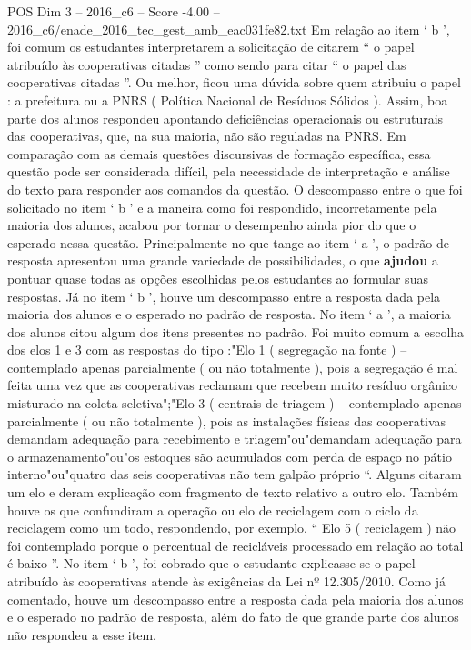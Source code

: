 \begin{textsample}{POS Dim 3 – 2016\_c6 – Score -4.00 – 2016\_c6/enade\_2016\_tec\_gest\_amb\_eac031fe82.txt}
Em relação ao item ‘ b ’, foi comum os estudantes interpretarem a solicitação de citarem “ o papel atribuído às cooperativas citadas ” como sendo para citar “ o papel das cooperativas citadas ”.
Ou melhor, ficou uma dúvida sobre quem atribuiu o papel : a prefeitura ou a PNRS ( Política Nacional de Resíduos Sólidos ).
Assim, boa parte dos alunos respondeu apontando deficiências operacionais ou estruturais das cooperativas, que, na sua maioria, não são reguladas na PNRS.
Em comparação com as demais questões discursivas de formação específica, essa questão pode ser considerada difícil, pela necessidade de interpretação e análise do texto para responder aos comandos da questão.
O descompasso entre o que foi solicitado no item ‘ b ’ e a maneira como foi respondido, incorretamente pela maioria dos alunos, acabou por tornar o desempenho ainda pior do que o esperado nessa questão.
Principalmente no que tange ao item ‘ a ’, o padrão de resposta apresentou uma grande variedade de possibilidades, o que \textbf{ajudou} a pontuar quase todas as opções escolhidas pelos estudantes ao formular suas respostas.
Já no item ‘ b ’, houve um descompasso entre a resposta dada pela maioria dos alunos e o esperado no padrão de resposta.
No item ‘ a ’, a maioria dos alunos citou algum dos itens presentes no padrão.
Foi muito comum a escolha dos elos 1 e 3 com as respostas do tipo :"Elo 1 ( segregação na fonte ) – contemplado apenas parcialmente ( ou não totalmente ), pois a segregação é mal feita uma vez que as cooperativas reclamam que recebem muito resíduo orgânico misturado na coleta seletiva";"Elo 3 ( centrais de triagem ) – contemplado apenas parcialmente ( ou não totalmente ), pois as instalações físicas das cooperativas demandam adequação para recebimento e triagem"ou"demandam adequação para o armazenamento"ou"os estoques são acumulados com perda de espaço no pátio interno"ou"quatro das seis cooperativas não tem galpão próprio “.
Alguns citaram um elo e deram explicação com fragmento de texto relativo a outro elo.
Também houve os que confundiram a operação ou elo de reciclagem com o ciclo da reciclagem como um todo, respondendo, por exemplo, “ Elo 5 ( reciclagem ) não foi contemplado porque o percentual de recicláveis processado em relação ao total é baixo ”.
No item ‘ b ’, foi cobrado que o estudante explicasse se o papel atribuído às cooperativas atende às exigências da Lei nº 12.305/2010.
Como já comentado, houve um descompasso entre a resposta dada pela maioria dos alunos e o esperado no padrão de resposta, além do fato de que grande parte dos alunos não respondeu a esse item.

\end{textsample}
